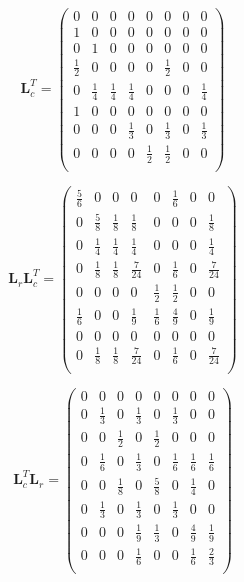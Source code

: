 \documentclass[11pt]{report}
\begin{document}
\begin{equation}
\textbf{L}_c^T=\left(
\begin{array}{cccccccc}
0 & 0 & 0 & 0 & 0 & 0 & 0 & 0 \\
1 & 0 & 0 & 0 & 0 & 0 & 0 & 0 \\
0 & 1 & 0 & 0 & 0 & 0 & 0 & 0 \\
\frac{1}{2} & 0 & 0 & 0 & 0 & \frac{1}{2} & 0 & 0 \\
0 & \frac{1}{4} & \frac{1}{4} & \frac{1}{4} & 0 & 0 & 0 & \frac{1}{4}\\
1 & 0 & 0 & 0 & 0 & 0 & 0 & 0 \\
0 & 0 & 0 & \frac{1}{3} & 0 & \frac{1}{3} & 0 & \frac{1}{3} \\
0 & 0 & 0 & 0 & \frac{1}{2} & \frac{1}{2} & 0 & 0 \\
\end{array}
\right)
\end{equation}

\begin{equation}
\textbf{L}_r\textbf{L}_c^T=\left(
\begin{array}{cccccccc}
\frac{5}{6} & 0 & 0 & 0 & 0 & \frac{1}{6} & 0 & 0 \\
0 & \frac{5}{8} & \frac{1}{8} & \frac{1}{8} & 0 & 0 & 0 & \frac{1}{8} \\
0 & \frac{1}{4} & \frac{1}{4} & \frac{1}{4} & 0 & 0 & 0 & \frac{1}{4} \\
0 & \frac{1}{8} & \frac{1}{8} & \frac{7}{24} & 0 & \frac{1}{6} & 0 & \frac{7}{24} \\
0 & 0 & 0 & 0 & \frac{1}{2} & \frac{1}{2} & 0 & 0\\
\frac{1}{6} & 0 & 0 & \frac{1}{9} & \frac{1}{6} & \frac{4}{9} & 0 & \frac{1}{9} \\
0 & 0 & 0 & 0 & 0 & 0 & 0 & 0 \\
0 & \frac{1}{8} & \frac{1}{8} & \frac{7}{24} & 0 & \frac{1}{6} & 0 & \frac{7}{24} \\
\end{array}
\right)
\end{equation}

\begin{equation}
\textbf{L}_c^T\textbf{L}_r=\left(
\begin{array}{cccccccc}
0 & 0 & 0 & 0 & 0 & 0 & 0 & 0 \\
0 & \frac{1}{3} & 0 & \frac{1}{3} & 0 & \frac{1}{3} & 0 & 0 \\
0 & 0 & \frac{1}{2} & 0 & \frac{1}{2} & 0 & 0 & 0 \\
0 & \frac{1}{6} & 0 & \frac{1}{3} & 0 & \frac{1}{6} & \frac{1}{6} & \frac{1}{6} \\
0 & 0 & \frac{1}{8} & 0 & \frac{5}{8} & 0 & \frac{1}{4} & 0 \\
0 & \frac{1}{3} & 0 & \frac{1}{3} & 0 & \frac{1}{3} & 0 & 0 \\
0 & 0 & 0 & \frac{1}{9} & \frac{1}{3} & 0 & \frac{4}{9} & \frac{1}{9} \\
0 & 0 & 0 & \frac{1}{6} & 0 & 0 & \frac{1}{6} & \frac{2}{3} \\
\end{array}
\right)
\end{equation}
\end{document}
